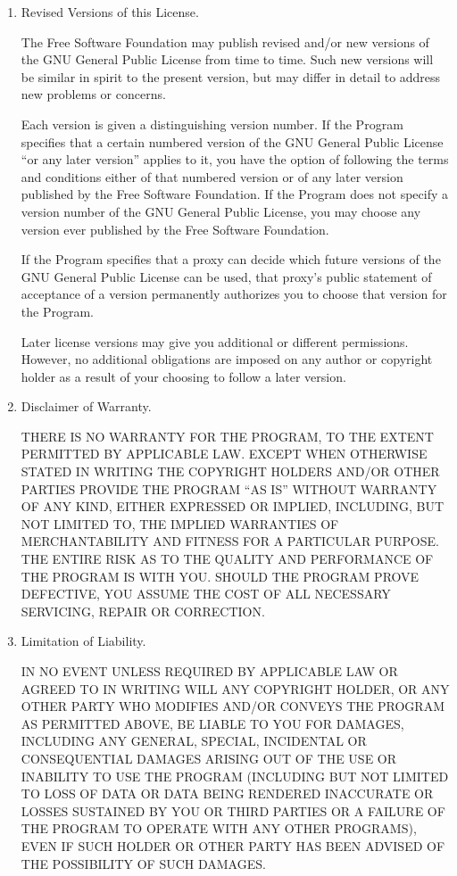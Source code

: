 \begin{enumerate}
\item Revised Versions of this License.

The Free Software Foundation may publish revised and/or new versions of
the GNU General Public License from time to time.  Such new versions will
be similar in spirit to the present version, but may differ in detail to
address new problems or concerns.

Each version is given a distinguishing version number.  If the
Program specifies that a certain numbered version of the GNU General
Public License ``or any later version'' applies to it, you have the
option of following the terms and conditions either of that numbered
version or of any later version published by the Free Software
Foundation.  If the Program does not specify a version number of the
GNU General Public License, you may choose any version ever published
by the Free Software Foundation.

If the Program specifies that a proxy can decide which future
versions of the GNU General Public License can be used, that proxy's
public statement of acceptance of a version permanently authorizes you
to choose that version for the Program.

Later license versions may give you additional or different
permissions.  However, no additional obligations are imposed on any
author or copyright holder as a result of your choosing to follow a
later version.

\item Disclaimer of Warranty.

\begin{sloppypar}
 THERE IS NO WARRANTY FOR THE PROGRAM, TO THE EXTENT PERMITTED BY
 APPLICABLE LAW.  EXCEPT WHEN OTHERWISE STATED IN WRITING THE
 COPYRIGHT HOLDERS AND/OR OTHER PARTIES PROVIDE THE PROGRAM ``AS IS''
 WITHOUT WARRANTY OF ANY KIND, EITHER EXPRESSED OR IMPLIED,
 INCLUDING, BUT NOT LIMITED TO, THE IMPLIED WARRANTIES OF
 MERCHANTABILITY AND FITNESS FOR A PARTICULAR PURPOSE.  THE ENTIRE
 RISK AS TO THE QUALITY AND PERFORMANCE OF THE PROGRAM IS WITH YOU.
 SHOULD THE PROGRAM PROVE DEFECTIVE, YOU ASSUME THE COST OF ALL
 NECESSARY SERVICING, REPAIR OR CORRECTION.
\end{sloppypar}

\item Limitation of Liability.

 IN NO EVENT UNLESS REQUIRED BY APPLICABLE LAW OR AGREED TO IN
 WRITING WILL ANY COPYRIGHT HOLDER, OR ANY OTHER PARTY WHO MODIFIES
 AND/OR CONVEYS THE PROGRAM AS PERMITTED ABOVE, BE LIABLE TO YOU FOR
 DAMAGES, INCLUDING ANY GENERAL, SPECIAL, INCIDENTAL OR CONSEQUENTIAL
 DAMAGES ARISING OUT OF THE USE OR INABILITY TO USE THE PROGRAM
 (INCLUDING BUT NOT LIMITED TO LOSS OF DATA OR DATA BEING RENDERED
 INACCURATE OR LOSSES SUSTAINED BY YOU OR THIRD PARTIES OR A FAILURE
 OF THE PROGRAM TO OPERATE WITH ANY OTHER PROGRAMS), EVEN IF SUCH
 HOLDER OR OTHER PARTY HAS BEEN ADVISED OF THE POSSIBILITY OF SUCH
 DAMAGES.


\end{enumerate}
